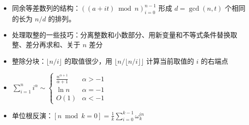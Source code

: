 \begin{summary}
    \begin{itemize}
    \item 同余等差数列的结构：$((a+it)\bmod n)_{i=0}^{n-1}$ 形成 $d=\gcd(n,t)$ 个相同的长为 $n/d$ 的排列。
    \item 处理取整的一些技巧：分离整数和小数部分、用新变量和不等式条件替换取整、差分再求和、关于 $n$ 差分
    \item 整除分块：$\lfloor n/i\rfloor$ 的取值很少，用 $\lfloor n/\lfloor n/i\rfloor\rfloor$ 计算当前取值的 $i$ 的右端点
    \item $\sum_{i=1}^n i^{\alpha}\sim\begin{cases}\frac{n^{\alpha+1}}{\alpha+1}&\alpha>-1\\\ln n& \alpha=-1\\O(1)&\alpha<-1\end{cases}$
    \item 单位根反演：$[n\bmod k=0]=\frac{1}{k}\sum_{i=0}^{k-1}\omega_k^{in}$
    \end{itemize}
\end{summary}
